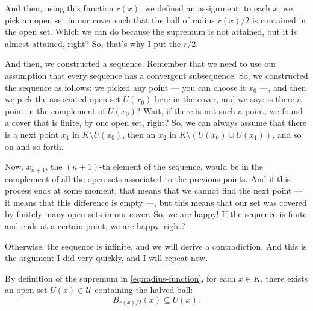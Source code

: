 \begin{proofWrapper}
\begin{speech}[00:03:00 - 00:04:47]
And then, using this function $r(x)$, we defined an assignment: to each $x$, we pick an open set in our cover such that the ball of radius $r(x)/2$ is contained in the open set. Which we can do because the supremum is not attained, but it is almost attained, right? So, that's why I put the $r/2$.

And then, we constructed a sequence. Remember that we need to use our assumption that every sequence has a convergent subsequence. So, we constructed the sequence as follows: we picked any point --- you can choose it $x_0$ ---, and then we pick the associated open set $U(x_0)$ here in the cover, and we say: is there a point in the complement of $U(x_0)$? Wait, if there is not such a point, we found a cover that is finite, by one open set, right? So, we can always assume that there is a next point $x_1$ in $K \setminus U(x_0)$, then an $x_2$ in $K \setminus (U(x_0) \cup U(x_1))$, and so on and so forth.

Now, $x_{n+1}$, the $(n+1)$-th element of the sequence, would be in the complement of all the open sets associated to the previous points. And if this process ends at some moment, that means that we cannot find the next point --- it means that this difference is empty ---, but this means that our set was covered by finitely many open sets in our cover. So, we are happy! If the sequence is finite and ends at a certain point, we are happy, right?

Otherwise, the sequence is infinite, and we will derive a contradiction. And this is the argument I did very quickly, and I will repeat now.
\end{speech}

\begin{content}
By definition of the supremum in \eqref{eq:radius-function}, for each $x \in K$, there exists an open set $U(x) \in \mathcal{U}$ containing the halved ball:
\begin{equation}\label{eq:assigned-set}
B_{r(x)/2}(x) \subseteq U(x).
\end{equation}


\end{content}
\end{proofWrapper}
